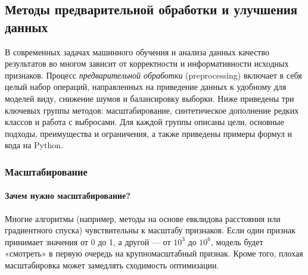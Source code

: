 \subsection{Методы предварительной обработки и улучшения данных}

В современных задачах машинного обучения и анализа данных качество результатов во многом зависит от корректности и информативности исходных признаков. Процесс \emph{предварительной обработки} (preprocessing) включает в себя целый набор операций, направленных на приведение данных к удобному для моделей виду, снижение шумов и балансировку выборки. Ниже приведены три ключевых группы методов: масштабирование, синтетическое дополнение редких классов и работа с выбросами. Для каждой группы описаны цели, основные подходы, преимущества и ограничения, а также приведены примеры формул и кода на Python.

\subsubsection{Масштабирование}
\label{sec:scaling}

\paragraph{Зачем нужно масштабирование?}  
Многие алгоритмы (например, методы на основе евклидова расстояния или градиентного спуска) чувствительны к масштабу признаков. Если один признак принимает значения от 0 до 1, а другой — от \(10^3\) до \(10^6\), модель будет «смотреть» в первую очередь на крупномасштабный признак. Кроме того, плохая масштабировка может замедлять сходимость оптимизации.

